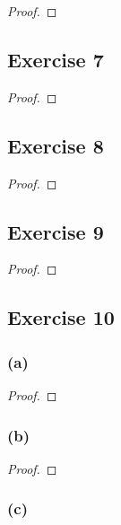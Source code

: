 \documentclass[14pt]{extarticle}
\begin{document}
\begin{proof}

\end{proof}

\subsection{Exercise 7}

\begin{proof}

\end{proof}

\subsection{Exercise 8}

\begin{proof}

\end{proof}

\subsection{Exercise 9}

\begin{proof}

\end{proof}

\subsection{Exercise 10}

\subsubsection{(a)}

\begin{proof}

\end{proof}

\subsubsection{(b)}

\begin{proof}

\end{proof}

\subsubsection{(c)}
\end{document}
